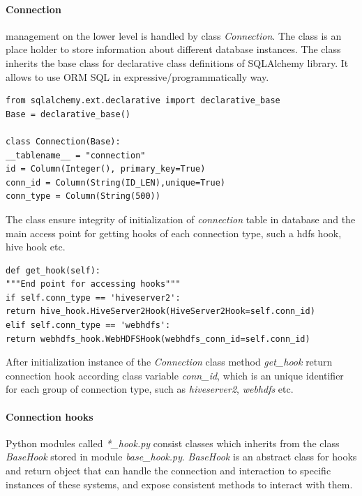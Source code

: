 \documentclass[a4paper,12pt,oneside]{report}
\begin{document}
	\paragraph{Connection} management on the  lower level is handled by  class
	\textit{Connection}. The class is an place holder to store information about
	different database instances. The class inherits the  base class for declarative
	class definitions of SQLAlchemy library. 
	It allows to use ORM SQL in expressive/programmatically way.  
	\begin{footnotesize}
		\begin{lstlisting}[style=python]
from sqlalchemy.ext.declarative import declarative_base
Base = declarative_base()

class Connection(Base):
__tablename__ = "connection"
id = Column(Integer(), primary_key=True)
conn_id = Column(String(ID_LEN),unique=True)
conn_type = Column(String(500))
		\end{lstlisting}
	\end{footnotesize}
	The class ensure integrity of initialization of \textit{connection} table in
	database and the main access point for getting hooks of each connection type,
	such a hdfs hook, hive hook etc. 
	\begin{footnotesize}
		\begin{lstlisting}[style=python]
def get_hook(self):
"""End point for accessing hooks"""
if self.conn_type == 'hiveserver2':
return hive_hook.HiveServer2Hook(HiveServer2Hook=self.conn_id)
elif self.conn_type == 'webhdfs':
return webhdfs_hook.WebHDFSHook(webhdfs_conn_id=self.conn_id)
		\end{lstlisting}
	\end{footnotesize}
	After initialization instance of the \textit{Connection} class method
	\textit{get\_hook} return connection hook according class variable
	\textit{conn\_id}, which is an unique identifier for each group of connection
	type, such as \textit{hiveserver2}, \textit{webhdfs} etc.
	
	\paragraph{Connection hooks}
	Python modules called \textit{*\_hook.py} consist classes which inherits from
	the class \textit{BaseHook} stored in module \textit{base\_hook.py}.
	\textit{BaseHook} is an abstract class for hooks and return object that can
	handle the connection and interaction to specific instances of these systems,
	and expose consistent methods to interact with them.
	
\end{document}
